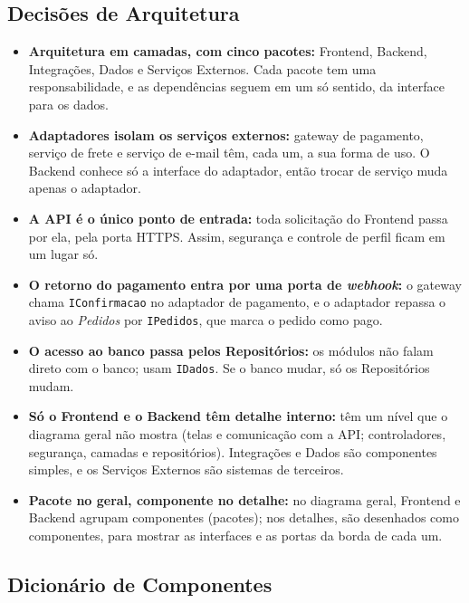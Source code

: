 \documentclass[12pt,a4paper]{article}
\begin{document}
\subsection{Decisões de Arquitetura}

\begin{itemize}
\setlength{\itemsep}{0.4em}
\item \textbf{Arquitetura em camadas, com cinco pacotes:} Frontend, Backend, Integrações, Dados e Serviços Externos. Cada pacote tem uma responsabilidade, e as dependências seguem em um só sentido, da interface para os dados.
\item \textbf{Adaptadores isolam os serviços externos:} gateway de pagamento, serviço de frete e serviço de e-mail têm, cada um, a sua forma de uso. O Backend conhece só a interface do adaptador, então trocar de serviço muda apenas o adaptador.
\item \textbf{A API é o único ponto de entrada:} toda solicitação do Frontend passa por ela, pela porta HTTPS. Assim, segurança e controle de perfil ficam em um lugar só.
\item \textbf{O retorno do pagamento entra por uma porta de \emph{webhook}:} o gateway chama \texttt{IConfirmacao} no adaptador de pagamento, e o adaptador repassa o aviso ao \emph{Pedidos} por \texttt{IPedidos}, que marca o pedido como pago.
\item \textbf{O acesso ao banco passa pelos Repositórios:} os módulos não falam direto com o banco; usam \texttt{IDados}. Se o banco mudar, só os Repositórios mudam.
\item \textbf{Só o Frontend e o Backend têm detalhe interno:} têm um nível que o diagrama geral não mostra (telas e comunicação com a API; controladores, segurança, camadas e repositórios). Integrações e Dados são componentes simples, e os Serviços Externos são sistemas de terceiros.
\item \textbf{Pacote no geral, componente no detalhe:} no diagrama geral, Frontend e Backend agrupam componentes (pacotes); nos detalhes, são desenhados como componentes, para mostrar as interfaces e as portas da borda de cada um.
\end{itemize}

\subsection{Dicionário de Componentes}
\end{document}
